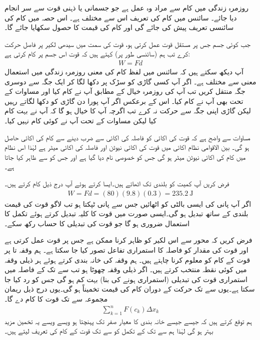 روزمرہ زندگی میں کام سے مراد وہ عمل ہے جو جسمانی یا ذہنی قوت سے سر انجام دیا جائے۔ سائنس میں کام کی تعریف اس سے مختلف ہے۔ اس حصہ میں کام کی سائنسی  تعریف پیش کی جائے گی اور کام کی قیمت کا حصول سکھایا جائے گا۔

جب کوئی جسم جس پر مستقل قوت  عمل کرتی ہو، قوت کی سمت میں سیدھی لکیر پر فاصل  حرکت کرے تب ہم (سائنسی طور پر) کہتے ہیں کہ قوت  اس جسم پر کام  کرتی ہے:
\begin{align}\label{مساوات_تکمل_استعمال_کام_مستقل_قوت}
W=Fd
\end{align}
آپ دیکھ سکتے ہیں کہ سائنس میں لفظ کام کی معنی روزمرہ زندگی میں استعمال معنی سے مختلف ہے۔ اگر آپ کسی گاڑی کو سڑک پر دکھا لگا کر ایک جگہ سے دوسری جگہ منتقل کریں تب آپ کی روزمرہ خیال کے مطابق آپ نے کام کیا اور مساوات  کے تحت بھی آپ نے کام کیا۔ اس کے برعکس اگر آپ پورا دن گاڑی کو دکھا لگاتے رہیں لیکن گاڑی اپنی جگہ سے حرکت نہ کرے تب اگرچہ آپ کا خیال ہو گا کہ آپ نے بہت کام کیا لیکن مساوات  کے تحت آپ نے کوئی کام نہیں کیا۔

مساوات  سے واضح ہے کہ قوت کی اکائی کو فاصلہ کی اکائی سے ضرب دینے سے کام کی اکائی حاصل ہو گی۔ بین الاقوامی نظام اکائی میں قوت کی اکائی نیوٹن  اور فاصلہ کی اکائی میٹر  ہے لہٰذا اس نظام میں کام کی اکائی نیوٹن میٹر   ہو گی جس کو خصوصی نام  دیا گیا ہے اور جس کو  سے ظاہر کیا جاتا ہے۔

فرض کریں  آپ   کمیت کو  بلندی تک اٹھاتے ہیں۔ایسا کرتے ہوئے آپ درج ذیل کام کرتے ہیں۔
\begin{align*}
W=Fd=(80)(9.8)(0.3)=\SI{235.2}{\joule}
\end{align*}
اگر آپ پانی کی ایسی بالٹی کو اٹھائیں جس سے پانی ٹپکتا ہو تب لاگو قوت کی قیمت بلندی کے ساتھ تبدیل ہو گی۔ایسی صورت میں قوت کا کلیہ  تبدیل کرتے ہوئے تکمل کا استعمال ضروری ہو گا جو قوت  کی تبدیلی کا حساب رکھ سکے۔ 

فرض کریں  کہ محور  سے اس لکیر کو ظاہر کرنا ممکن ہے جس پر قوت عمل کرتی ہے اور قوت کی مقدار  کو  فاصلہ  کا استمراری تفاعل تصور کیا جا سکتا ہے۔ ہم وقفہ  تا  پر قوت کے کام کو معلوم کرنا چاہتے ہیں۔  ہم وقفہ  کی خانہ بندی کرتے ہوئے ہر ذیلی وقفہ  میں کوئی نقطہ  منتخب کرتے ہیں۔ اگر ذیلی وقفہ چھوٹا ہو تب  سے  تک کے  فاصلہ میں  استمراری  قوت  کی تبدیلی (استمراری ہونے کی بنا) بہت کم ہو گی جس کو رد کیا جا سکتا ہے۔یوں  سے  تک حرکت کے دوران کام کی قیمت تخمیناً  ہو گی۔یوں درج ذیل ریمان مجموعہ  سے  تک قوت  کا کام دے گا۔
\begin{align}
\sum_{k=1}^n F(c_k)\Delta x_k
\end{align}
ہم توقع کرتے ہیں کہ  جیسے جیسے خانہ بندی کا معیار صفر تک پہنچتا ہو ویسے ویسے یہ تخمین مزید بہتر ہو گی لہٰذا ہم  سے  تک  کے تکمل کو  سے  تک قوت  کے کام کی تعریف لیتے ہیں۔ 

